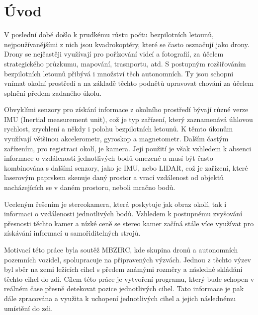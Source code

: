\documentclass[twoside]{ctuthesis}
\begin{document}
\maketitle

\chapter{Úvod}
V poslední době došlo k prudkému růstu počtu bezpilotních letounů, nejpoužívanějšími z nich jsou kvadrokoptéry, které se často osznačují jako drony. Drony se nejčastěji využívají pro pořízování videí a fotografií, za účelem strategického průzkumu, mapování, trasnportu, atd. S postupným rozšiřováním bezpilotních letounů přibývá i množství těch autonomních. Ty jsou schopni vnímat okolní prostředí a na základě těchto podnětů upravovat chování za účelem splnění předem zadaného úkolu.

Obvyklími senzory pro získání informace z okolního prostředí bývají různé verze IMU (Inertial measurement unit), což je typ zařízení, který zaznamenává úhlovou rychlost, zrychlení a někdy i polohu bezpilotních letounů. K těmto úkonům využívají většinou akcelerometr, gyroskop a magnetometr. Dalším častým zařízením, pro registraci okolí, je kamera. Její použití je však vzhledem k absenci informace o vzdálenosti jednotlivých bodů omezené a musí být často kombinována s dalšími senzory, jako je IMU, nebo LIDAR, což je zařízení, které laserovým paprskem skenuje daný prostor a vrací vzdálenost od objektů nacházejících se v daném prostoru, neboli mračno bodů.

Uceleným řešením je stereokamera, která poskytuje jak obraz okolí, tak i informaci o vzdálenosti jednotlivých bodů. Vzhledem k postupnému zvyšování přesnosti těchto kamer a nízké ceně se stereo kamer začíná stále více využívat pro získávání informací u samořiditelných strojů.

Motivací této práce byla soutěž MBZIRC, kde skupina dronů a autonomních pozemních vozidel, spolupracuje na připravených výzvách. Jednou z těchto výzev byl sběr na zemi ležících cihel s předem známými rozměry a následné skládání těchto cihel do zdi. Cílem této práce je vytvoření programu, který bude schopen v reálném čase přesně detekovat pozice jednotlivých cihel. Tato informace je pak dále zpracována a využita k uchopení jednotlivých cihel a jejich následnému umístění do zdi.
\end{document}
